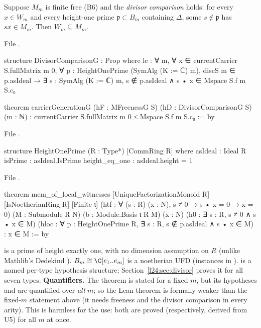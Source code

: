 \begin{theorem}[B8: $W_m=M_m$ from freeness and the divisor comparison]\label{l24:thm:B8}
Suppose $M_m$ is finite free (B6) and the \emph{divisor comparison} holds: for every $x\in W_m$ and every height-one
prime $\mathfrak p\subset B_m$ containing $\Delta$, some $s\notin\mathfrak p$ has $sx\in M_m$. Then $W_m\subseteq M_m$.
\end{theorem}
\noindent File .
\begin{leancode}
structure DivisorComparisonG : Prop where
  le : ∀ m, ∀ x ∈ currentCarrier S.fullMatrix m 0, ∀ p : HeightOnePrime (SymAlg (K := ℂ) m),
    discS m ∈ p.asIdeal → ∃ s : SymAlg (K := ℂ) m, s ∉ p.asIdeal ∧ s • x ∈ Mspace S.f m S.c₀

theorem carrierGenerationG (hF : MFreenessG S) (hD : DivisorComparisonG S) (m : ℕ) :
    currentCarrier S.fullMatrix m 0 ≤ Mspace S.f m S.c₀ := by
\end{leancode}
\noindent File .
\begin{leancode}
structure HeightOnePrime (R : Type*) [CommRing R] where
  asIdeal : Ideal R
  isPrime : asIdeal.IsPrime
  height_eq_one : asIdeal.height = 1
\end{leancode}
\noindent File .
\begin{leancode}
theorem mem_of_local_witnesses [UniqueFactorizationMonoid R] [IsNoetherianRing R] [Finite ι]
    (htf : ∀ (s : R) (x : N), s ≠ 0 → s • x = 0 → x = 0)
    (M : Submodule R N) (b : Module.Basis ι R M) (x : N)
    (h0 : ∃ s : R, s ≠ 0 ∧ s • x ∈ M)
    (hloc : ∀ p : HeightOnePrime R, ∃ s : R, s ∉ p.asIdeal ∧ s • x ∈ M) : x ∈ M := by
\end{leancode}

\begin{dictionary}
 is a prime of height exactly one, with no dimension assumption on $R$ (unlike Mathlib's
Dedekind ). $B_m\cong\C[e_1..e_m]$ is a noetherian UFD (instances in ).
 is a named per-type hypothesis structure; Section~\ref{l24:sec:divisor} proves it for all
seven types. \textbf{Quantifiers.} The theorem is stated for a fixed $m$, but its hypotheses  and
 are quantified over \emph{all} $m$; so the Lean theorem is formally weaker than the
fixed-$m$ statement above (it needs freeness and the divisor comparison in every arity). This is harmless for the
use: both are proved (respectively, derived from U5) for all $m$ at once.
\end{dictionary}

